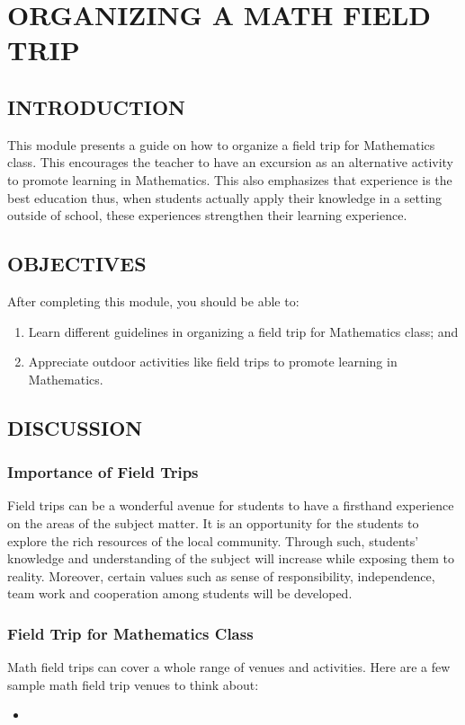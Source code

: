 \chapter{ORGANIZING A MATH FIELD TRIP}
\section*{INTRODUCTION}
This module presents a guide on how to organize a field trip for Mathematics class. This
encourages the teacher to have an excursion as an alternative activity to promote learning in
Mathematics. This also emphasizes that experience is the best education thus, when students actually
apply their knowledge in a setting outside of school, these experiences strengthen their learning
experience.
\section*{OBJECTIVES}
After completing this module, you should be able to:
\begin{enumerate}
\item Learn different guidelines in organizing a field trip for Mathematics class; and
\item Appreciate outdoor activities like field trips to promote learning in Mathematics.
\end{enumerate}
\section*{DISCUSSION}
\subsection*{Importance of Field Trips}
Field trips can be a wonderful avenue for students to have a firsthand experience on the areas
of the subject matter. It is an opportunity for the students to explore the rich resources of the local
community. Through such, students’ knowledge and understanding of the subject will increase while
exposing them to reality. Moreover, certain values such as sense of responsibility, independence, team
work and cooperation among students will be developed.
\subsection*{Field Trip for Mathematics Class}
Math field trips can cover a whole range of venues and activities. Here are a few sample math
field trip venues to think about:
\begin{itemize}
\item 
\end{itemize}
